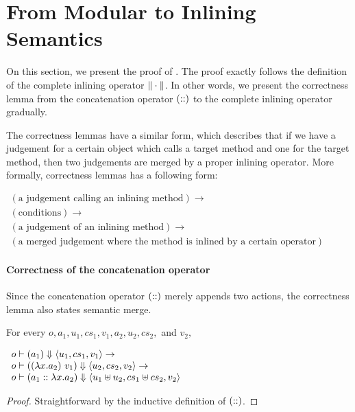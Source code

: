 \section{From Modular to Inlining Semantics}

On this section, we present the proof of . The
proof exactly follows the definition of the complete inlining operator
$\| \cdot \|$. In other words, we present the correctness lemma
from the concatenation operator $(::)$ to the complete
inlining operator gradually.

The correctness lemmas have a similar form, which describes that if we
have a judgement for a certain object which calls a target method and
one for the target method, then two judgements are merged by a proper
inlining operator. More formally, correctness lemmas has a following
form:
\begin{center}
  \begin{math}
    \begin{array}{l}
      (\textrm{a judgement calling an inlining method}) \to \\
      (\textrm{conditions}) \to \\
      (\textrm{a judgement of an inlining method}) \to \\
      (\textrm{a merged judgement where the method is inlined by a certain operator})
    \end{array}
  \end{math}
\end{center}

\paragraph{Correctness of the concatenation operator}

Since the concatenation operator $(::)$ merely appends two
actions, the correctness lemma also states semantic merge.

\begin{lemma}
  \label{lem-concatsymb}
  For every $o, a_1, u_1, cs_1, v_1, a_2, u_2, cs_2,$ and $v_2,$
  \begin{center}
    \begin{math}
      \begin{array}{l}
        o |- (a_1) \Downarrow \langle u_1, cs_1, v_1 \rangle \to \\
        o |- ((\lambda x.a_2)\ v_1) \Downarrow \langle u_2, cs_2, v_2 \rangle \to \\
        o |- (a_1 ::{} \lambda x.a_2) \Downarrow \langle u_1 \uplus u_2, cs_1 \uplus cs_2, v_2 \rangle
      \end{array}
    \end{math}
  \end{center}
\end{lemma}
\begin{proof}
  Straightforward by the inductive definition of $(::)$.
\end{proof}

